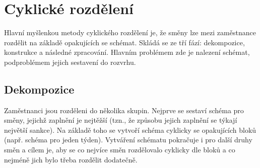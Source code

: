 \documentclass[twoside]{ctuthesis}
\begin{document}

%
%
% 
%
% 


\section{Cyklické rozdělení}
Hlavní myšlenkou metody cyklického rozdělení je, že směny lze mezi zaměstnance rozdělit na základě opakujících se schémat. Skládá se ze tří fází: dekompozice, konstrukce a následné zpracování. \cite{brucker2005decomposition} Hlavním problémem zde je nalezení schémat, podproblémem jejich sestavení do rozvrhu. \cite{becker2020decomposition}

\subsection{Dekompozice}
Zaměstnanci jsou rozděleni do několika skupin. Nejprve se sestaví schéma pro směny, jejichž zaplnění je nejtěžší (tzn., že způsobu jejich zaplnění se týkají největší sankce). Na základě toho se vytvoří schéma cyklicky se opakujících bloků (např. schéma pro jeden týden). Vytváření schématu pokračuje i pro další druhy směn a cílem je, aby se co nejvíce směn rozdělovalo cyklicky dle bloků a co nejméně jich bylo třeba rozdělit dodatečně.
\end{document}
